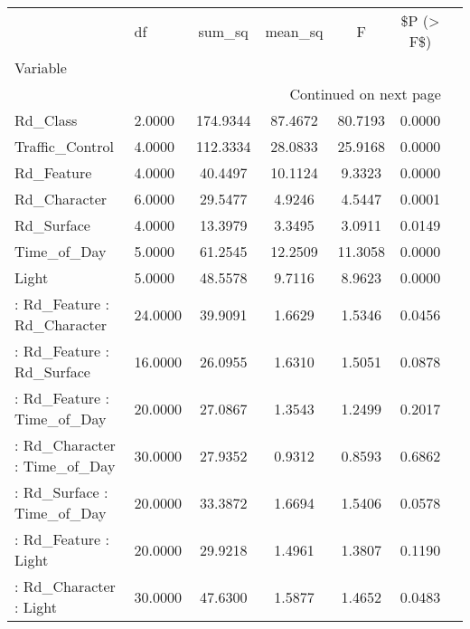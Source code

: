 \begin{longtable}{p{6cm}lccccc}
\toprule
{} &         df &     sum\_sq &  mean\_sq &       F &  \$P (> F\$) \\
Variable                                          &            &            &          &         &            \\
\midrule
\endhead
\midrule
\multicolumn{6}{r}{{Continued on next page}} \\
\midrule
\endfoot

\bottomrule
\endlastfoot
Rd\_Class                                          &     2.0000 &   174.9344 &  87.4672 & 80.7193 &     0.0000 \\
Traffic\_Control                                   &     4.0000 &   112.3334 &  28.0833 & 25.9168 &     0.0000 \\
Rd\_Feature                                        &     4.0000 &    40.4497 &  10.1124 &  9.3323 &     0.0000 \\
Rd\_Character                                      &     6.0000 &    29.5477 &   4.9246 &  4.5447 &     0.0001 \\
Rd\_Surface                                        &     4.0000 &    13.3979 &   3.3495 &  3.0911 &     0.0149 \\
Time\_of\_Day                                       &     5.0000 &    61.2545 &  12.2509 & 11.3058 &     0.0000 \\
Light                                             &     5.0000 &    48.5578 &   9.7116 &  8.9623 &     0.0000 \\
 : Rd\_Feature : Rd\_Character                      &    24.0000 &    39.9091 &   1.6629 &  1.5346 &     0.0456 \\
 : Rd\_Feature : Rd\_Surface                        &    16.0000 &    26.0955 &   1.6310 &  1.5051 &     0.0878 \\
 : Rd\_Feature : Time\_of\_Day                       &    20.0000 &    27.0867 &   1.3543 &  1.2499 &     0.2017 \\
 : Rd\_Character : Time\_of\_Day                     &    30.0000 &    27.9352 &   0.9312 &  0.8593 &     0.6862 \\
 : Rd\_Surface : Time\_of\_Day                       &    20.0000 &    33.3872 &   1.6694 &  1.5406 &     0.0578 \\
 : Rd\_Feature : Light                             &    20.0000 &    29.9218 &   1.4961 &  1.3807 &     0.1190 \\
 : Rd\_Character : Light                           &    30.0000 &    47.6300 &   1.5877 &  1.4652 &     0.0483 \\

\end{longtable}
